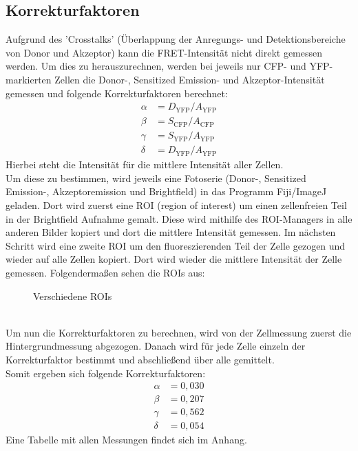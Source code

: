 \subsection{Korrekturfaktoren}
Aufgrund des 'Crosstalks' (Überlappung der Anregungs- und Detektionsbereiche von Donor und Akzeptor) kann die FRET-Intensität nicht direkt gemessen werden.
Um dies zu herauszurechnen, werden bei jeweils nur CFP- und YFP-markierten Zellen die Donor-, Sensitized Emission- und Akzeptor-Intensität gemessen und folgende Korrekturfaktoren berechnet:
\begin{align}
    \alpha&=D_\text{YFP}/A_\text{YFP}\\
    \beta&=S_\text{CFP}/A_\text{CFP}\\
    \gamma&=S_\text{YFP}/A_\text{YFP}\\
    \delta&=D_\text{YFP}/A_\text{YFP}
\end{align}
Hierbei steht die Intensität für die mittlere Intensität aller Zellen.\\
Um diese zu bestimmen, wird jeweils eine Fotoserie (Donor-, Sensitized Emission-, Akzeptoremission und Brightfield) in das Programm Fiji/ImageJ geladen.
Dort wird zuerst eine ROI (region of interest) um einen zellenfreien Teil in der Brightfield Aufnahme gemalt.
Diese wird mithilfe des ROI-Managers in alle anderen Bilder kopiert und dort die mittlere Intensität gemessen.
Im nächsten Schritt wird eine zweite ROI um den fluoreszierenden Teil der Zelle gezogen und wieder auf alle Zellen kopiert.
Dort wird wieder die mittlere Intensität der Zelle gemessen.\newpage
Folgendermaßen sehen die ROIs aus:
\begin{figure}[h]
    \centering{}
    \caption{Verschiedene ROIs}
\end{figure}\\
Um nun die Korrekturfaktoren zu berechnen, wird von der Zellmessung zuerst die Hintergrundmessung abgezogen.
Danach wird für jede Zelle einzeln der Korrekturfaktor bestimmt und abschließend über alle gemittelt.\\
Somit ergeben sich folgende Korrekturfaktoren:
\begin{align*}
    \alpha&=0,030\\
    \beta&=0,207\\
    \gamma&=0,562\\
    \delta&=0,054
\end{align*}
Eine Tabelle mit allen Messungen findet sich im Anhang.
